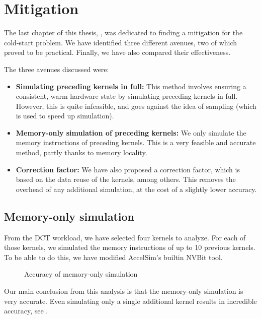 \section{Mitigation}\label{sec:mitigation}
The last chapter of this thesis, , was dedicated to finding a mitigation for the cold-start problem.
We have identified three different avenues, two of which proved to be practical.
Finally, we have also compared their effectiveness.

The three avenues discussed were:
\begin{itemize}
    \item \textbf{Simulating preceding kernels in full:} This method involves ensuring a consistent, warm hardware state by simulating preceding kernels in full.
    However, this is quite infeasible, and goes against the idea of sampling (which is used to speed up simulation).
    \item \textbf{Memory-only simulation of preceding kernels:} We only simulate the memory instructions of preceding kernels.
    This is a very feasible and accurate method, partly thanks to memory locality.
    \item \textbf{Correction factor:} We have also proposed a correction factor, which is based on the data reuse of the kernels, among others.
    This removes the overhead of any additional simulation, at the cost of a slightly lower accuracy.
\end{itemize}

\subsection{Memory-only simulation}\label{subsec:memory-only-simulation}
From the DCT workload, we have selected four kernels to analyze.
For each of those kernels, we simulated the memory instructions of up to 10 previous kernels.
To be able to do this, we have modified AccelSim's builtin NVBit tool.

\begin{figure}[hb]
    \centering
    \caption{Accuracy of memory-only simulation}
    \label{fig:concl-mitig-mem-acc}
\end{figure}

Our main conclusion from this analysis is that the memory-only simulation is very accurate.
Even simulating only a single additional kernel results in incredible accuracy, see .

